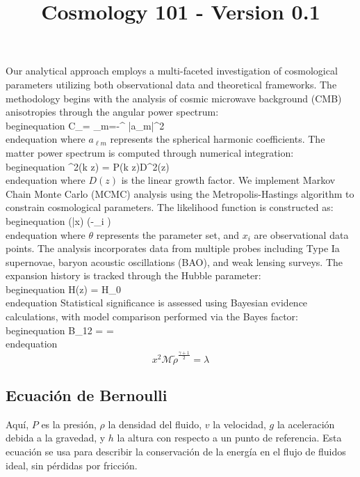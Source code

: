 \documentclass{article}\usepackage{graphicx} \usepackage{amsmath} \usepackage{colortbl}\title{Cosmology 101 - Version 0.1}
\begin{document}
Our analytical approach employs a multi-faceted investigation of cosmological parameters utilizing both observational data and theoretical frameworks. The methodology begins with the analysis of cosmic microwave background (CMB) anisotropies through the angular power spectrum:  \\begin{equation} C_\ell = \sum_{m=-\ell}^{\ell} |a_{\ell m}|^2 \\end{equation}  where $a_{\ell m}$ represents the spherical harmonic coefficients. The matter power spectrum is computed through numerical integration:  \\begin{equation} \Delta^2(k z) = P(k z)D^2(z) \\end{equation}  where $D(z)$ is the linear growth factor. We implement Markov Chain Monte Carlo (MCMC) analysis using the Metropolis-Hastings algorithm to constrain cosmological parameters. The likelihood function is constructed as:  \\begin{equation} (\theta|x) \propto \exp\left(-\sum_i \right) \\end{equation}  where $\theta$ represents the parameter set, and $x_i$ are observational data points. The analysis incorporates data from multiple probes including Type Ia supernovae, baryon acoustic oscillations (BAO), and weak lensing surveys. The expansion history is tracked through the Hubble parameter:  \\begin{equation} H(z) = H_0 \\end{equation}  Statistical significance is assessed using Bayesian evidence calculations, with model comparison performed via the Bayes factor:  \\begin{equation} B_{12} =  =  \\end{equation} \begin{equation}x^2 \mathcal{M} \tilde{\rho }^{\frac{\gamma +1}{2}}=\lambda \label{ber1} \end{equation}\subsection{Ecuaci{\'o}n de Bernoulli}
Aquí, $P$ es la presión, $\rho$ la densidad del fluido, $v$ la velocidad, $g$ la aceleración debida a la gravedad, y $h$ la altura con respecto a un punto de referencia. Esta ecuaci{\'o}n se usa para describir la conservación de la energía en el flujo de fluidos ideal, sin pérdidas por fricción.
\end{document}
